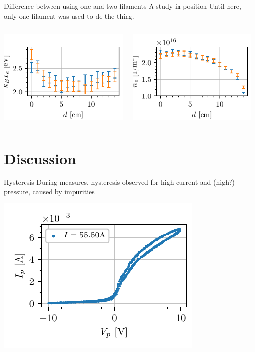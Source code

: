 \documentclass[10pt]{beamer}
\begin{document}
\begin{frame}{Difference between using one and two filaments}
    {A study in position}
    Until here, only one filament was used to do the thing.
    \begin{columns}
        \centering
        \includegraphics[scale=1]{../figures/temperatureeV_position_twofilaments.pdf}

        \centering
        \includegraphics[scale=1]{../figures/density_position_twofilaments.pdf}

    \end{columns}
\end{frame}

\section{Discussion}
\begin{frame}{Hysteresis}
    During measures,
    hysteresis observed for high current and (high?) pressure, caused by impurities

    \includegraphics[scale=1]{../figures/hysteresis.pdf}

\end{frame}
\end{document}

